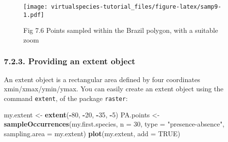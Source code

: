 \documentclass[]{article}
\newenvironment{Shaded}{\begin{snugshade}}{\end{snugshade}}
\newcommand{\KeywordTok}[1]{\textcolor[rgb]{0.13,0.29,0.53}{\textbf{#1}}}
\newcommand{\DataTypeTok}[1]{\textcolor[rgb]{0.13,0.29,0.53}{#1}}
\newcommand{\DecValTok}[1]{\textcolor[rgb]{0.00,0.00,0.81}{#1}}
\newcommand{\StringTok}[1]{\textcolor[rgb]{0.31,0.60,0.02}{#1}}
\newcommand{\CommentTok}[1]{\textcolor[rgb]{0.56,0.35,0.01}{\textit{#1}}}
\newcommand{\OtherTok}[1]{\textcolor[rgb]{0.56,0.35,0.01}{#1}}
\newcommand{\OperatorTok}[1]{\textcolor[rgb]{0.81,0.36,0.00}{\textbf{#1}}}
\newcommand{\NormalTok}[1]{#1}
\begin{document}
\begin{Shaded}
\end{Shaded}

\begin{figure}
\centering
\texttt{[image: virtualspecies-tutorial\_files/figure-latex/samp9-1.pdf]}
\caption{Fig 7.6 Points sampled within the Brazil polygon, with a
suitable zoom}
\end{figure}

\hypertarget{providing-an-extent-object}{\subsubsection{7.2.3. Providing
an extent object}\label{providing-an-extent-object}}

An extent object is a rectangular area defined by four coordinates
xmin/xmax/ymin/ymax. You can easily create an extent object using the
command \texttt{extent}, of the package \texttt{raster}:

\begin{Shaded}
\begin{Highlighting}[]
\NormalTok{my.extent <-}\StringTok{ }\KeywordTok{extent}\NormalTok{(}\OperatorTok{-}\DecValTok{80}\NormalTok{, }\OperatorTok{-}\DecValTok{20}\NormalTok{, }\OperatorTok{-}\DecValTok{35}\NormalTok{, }\OperatorTok{-}\DecValTok{5}\NormalTok{)}
\NormalTok{PA.points <-}\StringTok{ }\KeywordTok{sampleOccurrences}\NormalTok{(my.first.species,}
                               \DataTypeTok{n =} \DecValTok{30}\NormalTok{,}
                               \DataTypeTok{type =} \StringTok{"presence-absence"}\NormalTok{,}
                               \DataTypeTok{sampling.area =}\NormalTok{ my.extent)}
\KeywordTok{plot}\NormalTok{(my.extent, }\DataTypeTok{add =} \OtherTok{TRUE}\NormalTok{)}
\end{Highlighting}
\end{Shaded}
\end{document}
